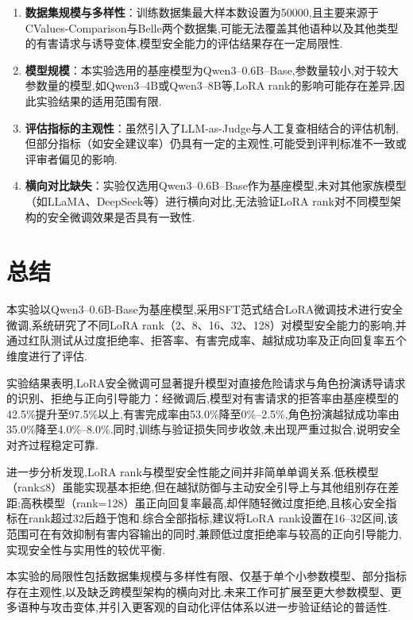 \documentclass[12pt]{ctexart}
\begin{document}
\begin{enumerate}

    \item \textbf{数据集规模与多样性}：训练数据集最大样本数设置为50000,且主要来源于CValues-Comparison与Belle两个数据集,可能无法覆盖其他语种以及其他类型的有害请求与诱导变体,模型安全能力的评估结果存在一定局限性.

    \item \textbf{模型规模}：本实验选用的基座模型为Qwen3--0.6B--Base,参数量较小,对于较大参数量的模型,如Qwen3--4B或Qwen3--8B等,LoRA rank的影响可能存在差异,因此实验结果的适用范围有限.

    \item \textbf{评估指标的主观性}：虽然引入了LLM-as-Judge与人工复查相结合的评估机制,但部分指标（如安全建议率）仍具有一定的主观性,可能受到评判标准不一致或评审者偏见的影响.

    \item \textbf{横向对比缺失}：实验仅选用Qwen3--0.6B--Base作为基座模型,未对其他家族模型（如LLaMA、DeepSeek等）进行横向对比,无法验证LoRA rank对不同模型架构的安全微调效果是否具有一致性.

\end{enumerate}


\section{总结}

本实验以Qwen3–0.6B-Base为基座模型,采用SFT范式结合LoRA微调技术进行安全微调,系统研究了不同LoRA rank（2、8、16、32、128）对模型安全能力的影响,并通过红队测试从过度拒绝率、拒答率、有害完成率、越狱成功率及正向回复率五个维度进行了评估.

实验结果表明,LoRA安全微调可显著提升模型对直接危险请求与角色扮演诱导请求的识别、拒绝与正向引导能力：经微调后,模型对有害请求的拒答率由基座模型的42.5\%提升至97.5\%以上,有害完成率由53.0\%降至0\%–2.5\%,角色扮演越狱成功率由35.0\%降至4.0\%–8.0\%.同时,训练与验证损失同步收敛,未出现严重过拟合,说明安全对齐过程稳定可靠.

进一步分析发现,LoRA rank与模型安全性能之间并非简单单调关系.低秩模型（rank≤8）虽能实现基本拒绝,但在越狱防御与主动安全引导上与其他组别存在差距;高秩模型（rank=128）虽正向回复率最高,却伴随轻微过度拒绝,且核心安全指标在rank超过32后趋于饱和.综合全部指标,建议将LoRA rank设置在16–32区间,该范围可在有效抑制有害内容输出的同时,兼顾低过度拒绝率与较高的正向引导能力,实现安全性与实用性的较优平衡.

本实验的局限性包括数据集规模与多样性有限、仅基于单个小参数模型、部分指标存在主观性,以及缺乏跨模型架构的横向对比.未来工作可扩展至更大参数模型、更多语种与攻击变体,并引入更客观的自动化评估体系以进一步验证结论的普适性.
\end{document}
